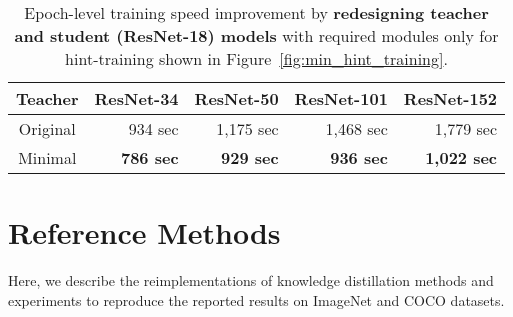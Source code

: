 \documentclass[runningheads]{llncs}
\begin{document}
\begin{table}[t]
    \caption{Epoch-level training speed improvement by \textbf{redesigning teacher and student (ResNet-18) models} with required modules only for hint-training shown in Figure~\ref{fig:min_hint_training}.}
    \begin{center}
    \bgroup
    \setlength{\tabcolsep}{0.3em}
    \def\arraystretch{1.1}
    \small
        \begin{tabular}{|c|r|r|r|r|}
            \hline
            \textbf{Teacher} & \textbf{ResNet-34} & \textbf{ResNet-50} & \textbf{ResNet-101} & \textbf{ResNet-152} \\ \hline
            Original & 934 sec & 1,175 sec & 1,468 sec & 1,779 sec \\
            Minimal & {\bf 786 sec} & {\bf 929 sec} & {\bf 936 sec} & {\bf 1,022 sec} \\
            \hline
        \end{tabular}
    \egroup
    \end{center}
\label{table:model_redesign}
\end{table}


\section{Reference Methods}
\label{sec:ref_methods}
Here, we describe the reimplementations of knowledge distillation methods and experiments to reproduce the reported results on ImageNet and COCO datasets.
\end{document}
